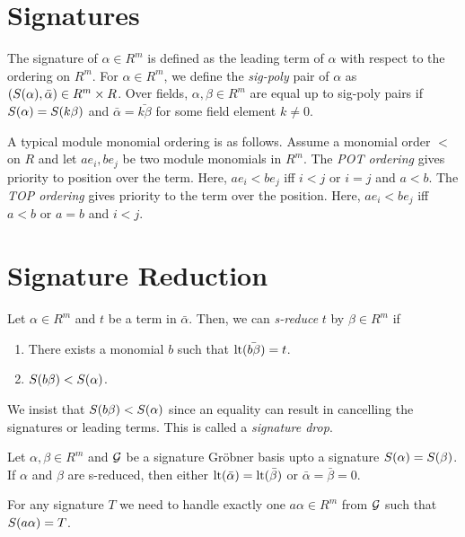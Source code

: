 \documentclass[twoside]{article}
\begin{document}
\section{Signatures}
\label{sec:signatures}

The signature of \(\alpha \in R^m\) is defined as the leading term of \(\alpha\)
with respect to the ordering on \(R^m\). For \(\alpha \in R^m\), we define the
\emph{sig-poly} pair of \(\alpha\)  as \((S(\alpha), \bar{\alpha}) \in
R^m \times R\). Over fields, \(\alpha, \beta \in R^m\) are equal up to sig-poly
pairs if \(S(\alpha) = S(k\beta)\) and \(\bar{\alpha} = \bar{k\beta}\)
for some field element \(k \neq 0\).

A typical module monomial ordering is as follows. Assume a monomial order \(<\)
on \(R\) and let \(ae_i, be_j\) be two module monomials in \(R^m\). The
\emph{POT ordering} gives priority to position over the term. Here, \(ae_i <
be_j\) iff \(i < j\) or \(i = j\) and \(a < b\). The \emph{TOP ordering} gives
priority to the term over the position. Here, \(ae_i < be_j\) iff \(a < b\) or
\(a = b\) and \(i < j\).

\section{Signature Reduction}
\label{sec:signature-reduction}

\begin{definition}
    Let \(\alpha \in R^m\) and \(t\) be a term in \(\bar{\alpha}\). Then, we can
    \emph{s-reduce} \(t\) by \(\beta \in R^m\) if
    \begin{enumerate}
        \item There exists a monomial \(b\) such that
        \(\mathrm{lt}(\bar{b\beta}) = t\).
        \item \(S(b\beta) < S(\alpha)\).
    \end{enumerate}
\end{definition}
We insist that \(S(b\beta) < S(\alpha)\) since an equality can result
in cancelling the signatures or leading terms. This is called a \emph{signature
drop}.

\begin{lemma}
    Let \(\alpha, \beta \in R^m\) and \(\mathcal G\) be a signature Gr\"{o}bner basis
    upto a signature \(S(\alpha) = S(\beta)\). If \(\alpha\) and
    \(\beta\) are s-reduced, then either \(\mathrm{lt}(\bar{\alpha}) =
    \mathrm{lt}(\bar{\beta})\) or \(\bar{\alpha} = \bar{\beta} = 0\).
\end{lemma}

\begin{lemma}
    For any signature \(T\) we need to handle exactly one \(a\alpha \in R^m\)
    from \(\mathcal G\) such that \(S(a\alpha) = T\).
\end{lemma}
\end{document}
